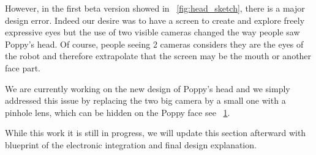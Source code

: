 However, in the first beta version showed in \figurename~\ref{fig:head_sketch}, there is a major design error. Indeed our desire was to have a screen to create and explore freely expressive eyes but the use of two visible cameras changed the way people saw Poppy's head. Of course, people seeing 2 cameras considers they are the eyes of the robot and therefore extrapolate that the screen may be the mouth or another face part.

We are currently working on the new design of Poppy's head and we simply addressed this issue by replacing the two big camera by a small one with a pinhole lens, which can be hidden on the Poppy face see \figurename~\ref{fig:poppy_head_v1}.

\begin{figure}[tb]
\centering
    \caption{}
    \label{fig:poppy_head_v1}
\end{figure}


While this work it is still in progress, we will update this section afterward with blueprint of the electronic integration and final design explanation.
